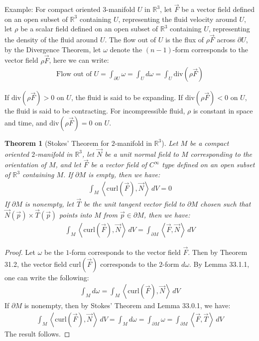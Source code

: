 \documentclass[11pt,oneside]{book}
\theoremstyle{break}
\theoremstyle{break}
\newtheorem{thm}{Theorem}[section]
\newcommand{\R}{\mathbb{R}}
\newcommand{\example}{\color{green}Example: \color{black}}
\begin{document}
\example For compact oriented $3$-manifold $U$ in $\R^3$, let $\vec{F}$ be a vector field defined on an open subset of $\R^3$ containing $U$, representing the fluid velocity around $U$, let $\rho$ be a scalar field defined on an open subset of $\R^3$ containing $U$, representing the density of the fluid around $U$. The flow out of $U$ is the flux of $\rho \vec{F}$ across $\partial U$, by the Divergence Theorem, let $\omega$ denote the $(n-1)$-form corresponds to the vector field $\rho \vec{F}$, here we can write:
\begin{align*}
\text{Flow out of }U = \int_{\partial U}\omega = \int_U d\omega = \int_U \text{div}(\rho \vec{F})
\end{align*}

If $\text{div}(\rho \vec{F})>0$ on $U$, the fluid is said to be expanding. If $\text{div}(\rho \vec{F})<0$ on $U$, the fluid is said to be contracting. For incompressible fluid, $\rho$ is constant in space and time, and $\text{div}(\rho \vec{F})  =0$ on $U$.\\

\begin{thm}[Stokes' Theorem for $2$-manifold in $\R^3$]
Let $M$ be a compact oriented $2$-manifold in $\R^3$, let $\vec{N}$ be a unit normal field to $M$ corresponding to the orientation of $M$, and let $\vec{F}$ be a vector field of $C^\infty$ type defined on an open subset of $\R^3$ containing $M$. If $\partial M$ is empty, then we have:
\begin{align*}
\int_M \left< \text{curl}(\vec{F}),\vec{N}\right> \, dV = 0
\end{align*}
If $\partial M$ is nonempty, let $\vec{T}$ be the unit tangent vector field to $\partial M$ chosen such that $\vec{N}(\vec{p}) \times \vec{T}(\vec{p})$ points into $M$ from $\vec{p}\in \partial M$, then we have:
\begin{align*}
\int_M \left< \text{curl}(\vec{F}),\vec{N}\right> \, dV = \int_{\partial M}\left< \vec{F},\vec{N}\right>\, dV
\end{align*}
\end{thm}
\begin{proof}
Let $\omega$ be the $1$-form corresponds to the vector field $\vec{F}$. Then by Theorem 31.2, the vector field $\text{curl}(\vec{F})$ corresponds to the $2$-form $d\omega$. By Lemma 33.1.1, one can write the following:
\begin{align*}
\int_M d\omega = \int_M \left< \text{curl}(\vec{F}),\vec{N}\right>\, dV
\end{align*}
If $\partial M$ is nonempty, then by Stokes' Theorem and Lemma 33.0.1, we have:
\begin{align*}
\int_M \left< \text{curl}(\vec{F}),\vec{N}\right>\, dV = \int_{M}d\omega=\int_{\partial M}\omega = \int_{\partial M}\left< \vec{F},\vec{T}\right> \, dV
\end{align*}
The result follows.
\end{proof}
\end{document}
